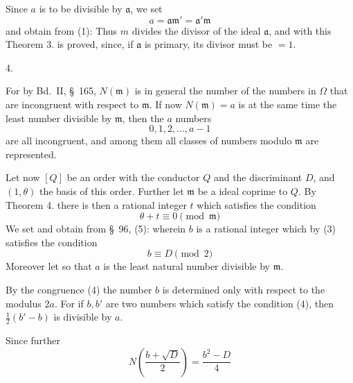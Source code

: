 
Since $a$ is to be divisible by $\mathfrak{a}$, we set
\[ a = \mathfrak{a}\mathfrak{m}' = \mathfrak{a}'\mathfrak{m} \]
and obtain from (1):
Thus $m$ divides the divisor of the ideal $\mathfrak{a}$, and with this Theorem 3. is proved, since, if $\mathfrak{a}$ is primary, its divisor must be $= 1$.

4. 

For by Bd.\ II, \S\ 165, $N(\mathfrak{m})$ is in general the number of the numbers in $\Omega$ that are incongruent with respect to $\mathfrak{m}$. If now $N(\mathfrak{m}) = a$ is at the same time the least  number divisible by $\mathfrak{m}$, then the $a$ numbers
\[ 0, 1, 2, \ldots, a - 1 \]
are all incongruent, and among them all classes of numbers modulo $\mathfrak{m}$ are represented.

Let now $[Q]$ be an order with the conductor $Q$ and the discriminant $D$, and $(1, \theta)$ the basis of this order. Further let $\mathfrak{m}$ be a  ideal coprime to $Q$. By Theorem 4. there is then a rational integer $t$ which satisfies the condition
\[ \theta + t \equiv 0 \pmod{\mathfrak{m}} \]
We set
and obtain from \S\ 96, (5):
wherein $b$ is a rational integer which by (3) satisfies the condition
\[ b \equiv D \pmod{2} \]
Moreover let
so that $a$ is the least natural number divisible by $\mathfrak{m}$.

By the congruence (4) the number $b$ is determined only with respect to the modulus $2a$. For if $b, b'$ are two numbers which satisfy the condition (4), then $\frac{1}{2}(b' - b)$ is divisible by $a$.

Since further
\[ N\left(\frac{b + \sqrt{D}}{2}\right) = \frac{b^2 - D}{4} \]
